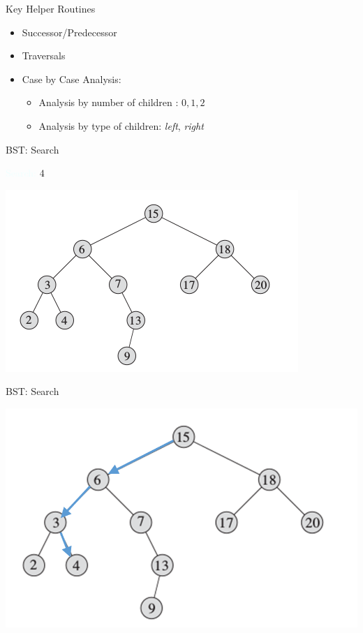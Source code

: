 \documentclass{beamer}
\newcommand{\tblue}[1]{{\Large {\textcolor{azure}{#1}}}}
\begin{document}
\begin{frame}{Key Helper Routines}
    \begin{itemize}
        \item Successor/Predecessor
        \item Traversals
        \item Case by Case Analysis:
        \begin{itemize}
            \item Analysis by number of children : $0, 1, 2$
            \item Analysis by type of children: {\em left}, {\em right}
        \end{itemize}
    \end{itemize}
\end{frame}

\begin{frame}{BST: Search}

\tblue{Search:} $4$
    \begin{center}
        \includegraphics[scale=0.7]{bstSearch.png}
    \end{center}
\end{frame}


\begin{frame}{BST: Search}
    \begin{center}
        \includegraphics[scale=0.5]{bstSearch2.png}
    \end{center}
\end{frame}
\end{document}
